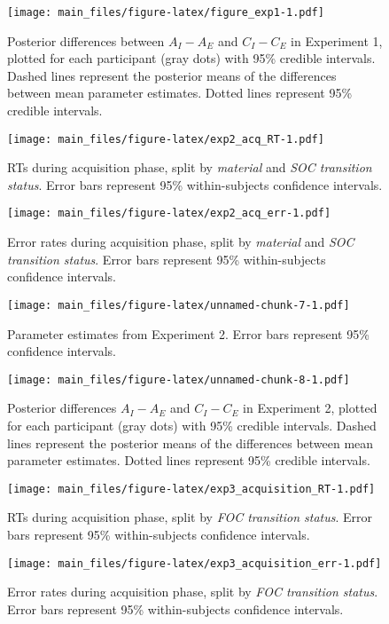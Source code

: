 \documentclass[floatsintext,man]{apa6}
\begin{document}
\begin{figure}[htbp]
\centering
\texttt{[image: main\_files/figure-latex/figure\_exp1-1.pdf]}
\caption{Posterior differences between \(A_I - A_E\) and \(C_I - C_E\)
in Experiment 1, plotted for each participant (gray dots) with 95\%
credible intervals. Dashed lines represent the posterior means of the
differences between mean parameter estimates. Dotted lines represent
95\% credible intervals.}
\end{figure}

\begin{figure}[htbp]
\centering
\texttt{[image: main\_files/figure-latex/exp2\_acq\_RT-1.pdf]}
\caption{RTs during acquisition phase, split by \emph{material} and
\emph{SOC transition status}. Error bars represent 95\% within-subjects
confidence intervals.}
\end{figure}

\begin{figure}[htbp]
\centering
\texttt{[image: main\_files/figure-latex/exp2\_acq\_err-1.pdf]}
\caption{Error rates during acquisition phase, split by \emph{material}
and \emph{SOC transition status}. Error bars represent 95\%
within-subjects confidence intervals.}
\end{figure}

\begin{figure}[htbp]
\centering
\texttt{[image: main\_files/figure-latex/unnamed-chunk-7-1.pdf]}
\caption{Parameter estimates from Experiment 2. Error bars represent
95\% confidence intervals.}
\end{figure}

\begin{figure}[htbp]
\centering
\texttt{[image: main\_files/figure-latex/unnamed-chunk-8-1.pdf]}
\caption{Posterior differences \(A_I - A_E\) and \(C_I - C_E\) in
Experiment 2, plotted for each participant (gray dots) with 95\%
credible intervals. Dashed lines represent the posterior means of the
differences between mean parameter estimates. Dotted lines represent
95\% credible intervals.}
\end{figure}

\begin{figure}[htbp]
\centering
\texttt{[image: main\_files/figure-latex/exp3\_acquisition\_RT-1.pdf]}
\caption{RTs during acquisition phase, split by \emph{FOC transition
status}. Error bars represent 95\% within-subjects confidence
intervals.\label{fig:figure_exp3_RT}}
\end{figure}

\begin{figure}[htbp]
\centering
\texttt{[image: main\_files/figure-latex/exp3\_acquisition\_err-1.pdf]}
\caption{Error rates during acquisition phase, split by \emph{FOC
transition status}. Error bars represent 95\% within-subjects confidence
intervals. \label{fig:figure_exp3_ER}}
\end{figure}
\end{document}
